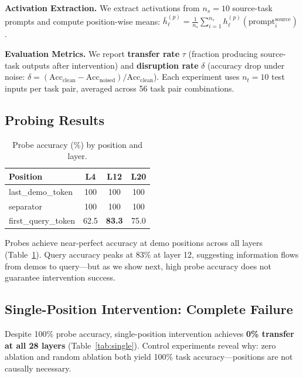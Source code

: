 \documentclass[sigconf,anonymous]{acmart}
\begin{document}
\textbf{Activation Extraction.} We extract activations from $n_s = 10$ source-task prompts and compute position-wise means: $\bar{h}_\ell^{(p)} = \frac{1}{n_s} \sum_{i=1}^{n_s} h_\ell^{(p)}(\text{prompt}_i^{\text{source}})$.

\textbf{Evaluation Metrics.} We report \textbf{transfer rate} $\tau$ (fraction producing source-task outputs after intervention) and \textbf{disruption rate} $\delta$ (accuracy drop under noise: $\delta = (\text{Acc}_{\text{clean}} - \text{Acc}_{\text{noised}}) / \text{Acc}_{\text{clean}}$). Each experiment uses $n_t = 10$ test inputs per task pair, averaged across 56 task pair combinations.

\subsection{Probing Results}

\begin{table}[t]
\centering
\caption{Probe accuracy (\%) by position and layer.}
\label{tab:probing}
\begin{tabular}{@{}lccc@{}}
\toprule
Position & L4 & L12 & L20 \\
\midrule
last\_demo\_token & 100 & 100 & 100 \\
separator & 100 & 100 & 100 \\
first\_query\_token & 62.5 & \textbf{83.3} & 75.0 \\
\bottomrule
\end{tabular}
\end{table}

Probes achieve near-perfect accuracy at demo positions across all layers (Table~\ref{tab:probing}). Query accuracy peaks at 83\% at layer 12, suggesting information flows from demos to query---but as we show next, high probe accuracy does not guarantee intervention success.

\subsection{Single-Position Intervention: Complete Failure}

Despite 100\% probe accuracy, single-position intervention achieves \textbf{0\% transfer at all 28 layers} (Table~\ref{tab:single}). Control experiments reveal why: zero ablation and random ablation both yield 100\% task accuracy---positions are not causally necessary.
\end{document}
